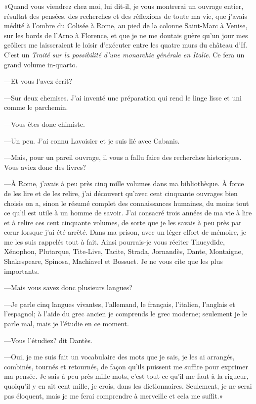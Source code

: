 «Quand vous viendrez chez moi, lui dit-il, je vous montrerai un ouvrage entier, résultat des pensées, des recherches et des réflexions de toute ma vie, que j'avais médité à l'ombre du Colisée à Rome, au pied de la colonne Saint-Marc à Venise, sur les bords de l'Arno à Florence, et que je ne me doutais guère qu'un jour mes geôliers me laisseraient le loisir d'exécuter entre les quatre murs du château d'If. C'est un \textit{Traité sur la possibilité d'une monarchie générale en Italie}. Ce fera un grand volume in-quarto.

—Et vous l'avez écrit?

—Sur deux chemises. J'ai inventé une préparation qui rend le linge lisse et uni comme le parchemin.

—Vous êtes donc chimiste.

—Un peu. J'ai connu Lavoisier et je suis lié avec Cabanis.

—Mais, pour un pareil ouvrage, il vous a fallu faire des recherches historiques. Vous aviez donc des livres?

—À Rome, j'avais à peu près cinq mille volumes dans ma bibliothèque. À force de les lire et de les relire, j'ai découvert qu'avec cent cinquante ouvrages bien choisis on a, sinon le résumé complet des connaissances humaines, du moins tout ce qu'il est utile à un homme de savoir. J'ai consacré trois années de ma vie à lire et à relire ces cent cinquante volumes, de sorte que je les savais à peu près par cœur lorsque j'ai été arrêté. Dans ma prison, avec un léger effort de mémoire, je me les suis rappelés tout à fait. Ainsi pourrais-je vous réciter Thucydide, Xénophon, Plutarque, Tite-Live, Tacite, Strada, Jornandès, Dante, Montaigne, Shakespeare, Spinosa, Machiavel et Bossuet. Je ne vous cite que les plus importants.

—Mais vous savez donc plusieurs langues?

—Je parle cinq langues vivantes, l'allemand, le français, l'italien, l'anglais et l'espagnol; à l'aide du grec ancien je comprends le grec moderne; seulement je le parle mal, mais je l'étudie en ce moment.

—Vous l'étudiez? dit Dantès.

—Oui, je me suis fait un vocabulaire des mots que je sais, je les ai arrangés, combinés, tournés et retournés, de façon qu'ils puissent me suffire pour exprimer ma pensée. Je sais à peu près mille mots, c'est tout ce qu'il me faut à la rigueur, quoiqu'il y en ait cent mille, je crois, dans les dictionnaires. Seulement, je ne serai pas éloquent, mais je me ferai comprendre à merveille et cela me suffit.»

